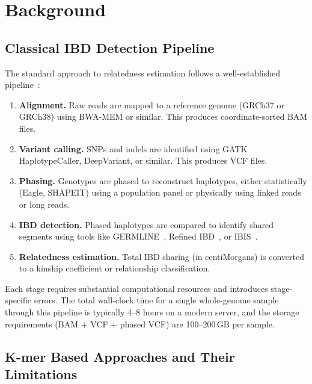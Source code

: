 \documentclass{../yalumba}
\begin{document}
\section{Background}
\label{sec:background}

\subsection{Classical IBD Detection Pipeline}

The standard approach to relatedness estimation follows a well-established
pipeline~\cite{browning2012ibd, gusev2009germline}:

\begin{enumerate}
  \item \textbf{Alignment.}  Raw reads are mapped to a reference genome (GRCh37
        or GRCh38) using BWA-MEM or similar.  This produces coordinate-sorted
        BAM files.
  \item \textbf{Variant calling.}  SNPs and indels are identified using GATK
        HaplotypeCaller, DeepVariant, or similar.  This produces VCF files.
  \item \textbf{Phasing.}  Genotypes are phased to reconstruct haplotypes,
        either statistically (Eagle, SHAPEIT) using a population panel or
        physically using linked reads or long reads.
  \item \textbf{IBD detection.}  Phased haplotypes are compared to identify
        shared segments using tools like GERMLINE~\cite{gusev2009germline},
        Refined IBD~\cite{browning2013refinedibd}, or
        IBIS~\cite{browning2020ibis}.
  \item \textbf{Relatedness estimation.}  Total IBD sharing (in centiMorgans)
        is converted to a kinship coefficient or relationship classification.
\end{enumerate}

Each stage requires substantial computational resources and introduces
stage-specific errors.  The total wall-clock time for a single whole-genome
sample through this pipeline is typically 4--8 hours on a modern server, and
the storage requirements (BAM + VCF + phased VCF) are 100--200\,GB per sample.

\subsection{K-mer Based Approaches and Their Limitations}
\end{document}
